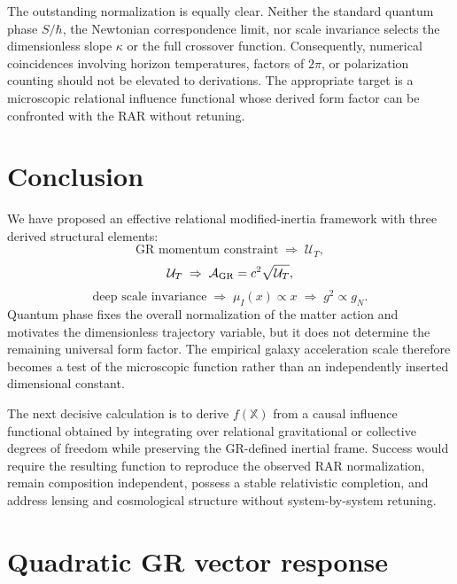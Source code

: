 \documentclass[11pt]{article}
\newcommand{\UT}{\mathcal{U}_{T}}
\newcommand{\Xop}{\mathbb{X}}
\begin{document}
The outstanding normalization is equally clear. Neither the standard quantum phase $S/\hbar$, the Newtonian correspondence limit, nor scale invariance selects the dimensionless slope $\kappa$ or the full crossover function. Consequently, numerical coincidences involving horizon temperatures, factors of $2\pi$, or polarization counting should not be elevated to derivations. The appropriate target is a microscopic relational influence functional whose derived form factor can be confronted with the RAR without retuning.

\section{Conclusion}

We have proposed an effective relational modified-inertia framework with three derived structural elements:
\begin{equation}
    \text{GR momentum constraint}
    \;\Rightarrow\;
    \UT,
\end{equation}
\begin{equation}
    \UT
    \;\Rightarrow\;
    \mathcal A_{\rm GR}=c^2\sqrt{\UT},
\end{equation}
\begin{equation}
    \text{deep scale invariance}
    \;\Rightarrow\;
    \mu_I(x)\propto x
    \;\Rightarrow\;
    g^2\propto g_N.
\end{equation}
Quantum phase fixes the overall normalization of the matter action and motivates the dimensionless trajectory variable, but it does not determine the remaining universal form factor. The empirical galaxy acceleration scale therefore becomes a test of the microscopic function rather than an independently inserted dimensional constant.

The next decisive calculation is to derive $f(\Xop)$ from a causal influence functional obtained by integrating over relational gravitational or collective degrees of freedom while preserving the GR-defined inertial frame. Success would require the resulting function to reproduce the observed RAR normalization, remain composition independent, possess a stable relativistic completion, and address lensing and cosmological structure without system-by-system retuning.

\appendix

\section{Quadratic GR vector response}
\end{document}
